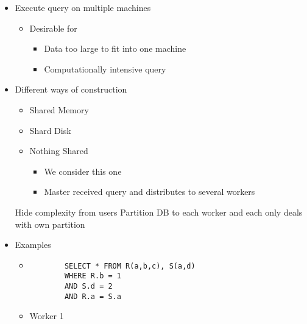 \begin{itemize}
\begin{itemize}
\begin{itemize}
\begin{tabular}{l | c | c}
\end{tabular}
                \end{itemize}
        \end{itemize}
        \begin{itemize}
            \item Execute query on multiple machines 
                \begin{itemize}
                    \item Desirable for
                        \begin{itemize}
                            \item Data too large to fit into one machine
                            \item Computationally intensive query
                        \end{itemize}
                \end{itemize}
            \item Different ways of construction
                \begin{itemize}
                    \item Shared Memory
                    \item Shard Disk
                    \item Nothing Shared
                        \begin{itemize}
                            \item We consider this one
                            \item Master received query and distributes to several workers
                        \end{itemize}
                \end{itemize}
             Hide complexity from users
             Partition DB to each worker and each only deals with own partition
            \item Examples
                \begin{itemize}
                        \begin{itemize}
                            \item 
        \begin{verbatim}
        SELECT * FROM R(a,b,c), S(a,d)
        WHERE R.b = 1
        AND S.d = 2
        AND R.a = S.a
        \end{verbatim}
                            \item Worker 1

\end{itemize}
\end{itemize}
\end{itemize}
\end{itemize}
